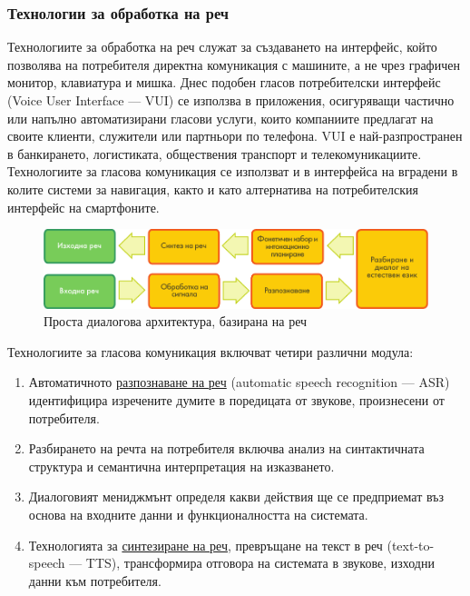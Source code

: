 \documentclass[]{../../metanetpaper}
\begin{document}
\begin{multicols}{2}
\subsubsection{Технологии за обработка на реч}

Технологиите за обработка на реч служат за създаването на интерфейс, който позволява на потребителя директна комуникация с машините, а не чрез графичен монитор, клавиатура и мишка. Днес подобен гласов
 потребителски интерфейс (Voice User Interface — VUI) се използва в приложения, осигуряващи частично или напълно
 автоматизирани гласови услуги, които компаниите предлагат на своите клиенти, служители или партньори
 по телефона. VUI е най-разпространен в банкирането, логистиката,
 обществения транспорт и телекомуникациите.
 Технологиите за гласова комуникация се използват и в интерфейса на вградени в колите системи за навигация, както и като алтернатива на потребителския
 интерфейс на смартфоните.

\begin{figure}[htb]
  \center  \includegraphics[width=\textwidth]{../_media/bulgarian/simple_speech-based_dialogue_architecture}
  \center
  \caption{Проста диалогова архитектура, базирана на реч}
  \label{fig:dialoguearch_de}
\end{figure}

Технологиите за гласова комуникация включват четири различни модула:

\begin{enumerate}
\item Автоматичното \uline{разпознаване на реч}  (automatic speech recognition — ASR)  идентифицира изречените думите в поредицата от звукове, произнесени от потребителя.
\item Разбирането на речта на потребителя включва анализ на синтактичната структура и семантична интерпретация  на изказването.
\item Диалоговият мениджмънт определя какви действия ще се предприемат въз основа на входните данни и функционалността на системата.
\item Технологията за \uline{синтезиране на реч}, превръщане на текст в
 реч (text-to-speech — TTS), трансформира отговора на системата в
 звукове, изходни данни към потребителя.
\end{enumerate}


\end{multicols}
\end{document}
